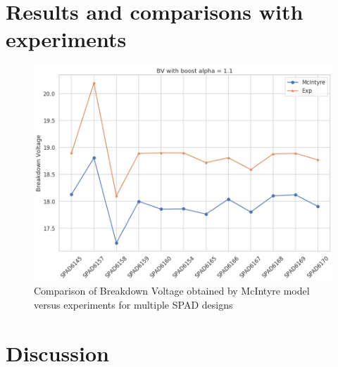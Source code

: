 \documentclass[10pt,a4paper,twocolumn]{article}
\begin{document}
\section{Results and comparisons with experiments}
\begin{figure}[h]
\caption{Comparison of Breakdown Voltage obtained by McIntyre model versus experiments for multiple SPAD designs}
\centering
\includegraphics[scale=0.28]{../pictures/BvMcIntyreExp.png}
\end{figure}


\section{Discussion}

\newpage
\newpage
\nocite{*}


\end{document}
